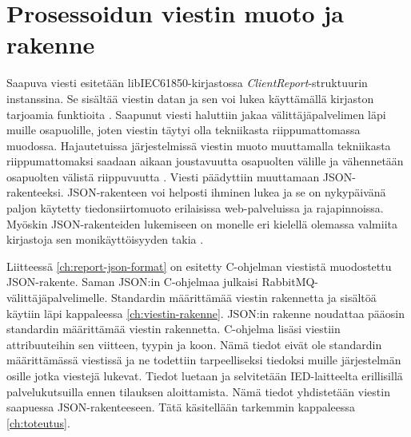 \section{Prosessoidun viestin muoto ja rakenne}
Saapuva viesti esitetään libIEC61850-kirjastossa \emph{ClientReport}-struk\-tuu\-rin instanssina. Se sisältää viestin datan ja sen voi lukea käyttämällä kirjaston tarjoamia funktioita \cite{libIEC61850-doc}. Saapunut viesti haluttiin jakaa välittäjäpalvelimen läpi muille osapuolille, joten viestin täytyi olla tekniikasta riippumattomassa muodossa. Hajautetuissa järjestelmissä viestin muoto muuttamalla tekniikasta riippumattomaksi saadaan aikaan joustavuutta osapuolten välille ja vähennetään osapuolten välistä riippuvuutta \cite[s.~838]{distributed-systems-concepts-and-design}. Viesti päädyttiin muuttamaan JSON-rakenteeksi. JSON-rakenteen voi helposti ihminen lukea ja se on nykypäivänä paljon käytetty tiedonsiirtomuoto erilaisissa web-palveluissa ja rajapinnoissa. Myöskin JSON-rakenteiden lukemiseen on monelle eri kielellä olemassa valmiita kirjastoja sen monikäyttöisyyden takia \mbox{\cite{Patrizio2016}}.

Liitteessä \ref{ch:report-json-format} on esitetty C-ohjelman viestistä muodostettu JSON-rakente. Saman JSON:in C-ohjelmaa julkaisi RabbitMQ-välittäjäpalvelimelle. Standardin määrittämää viestin rakennetta ja sisältöä käytiin läpi kappaleessa \ref{ch:viestin-rakenne}. JSON:in rakenne noudattaa pääosin standardin määrittämää viestin rakennetta. C-ohjelma lisäsi viestiin attribuuteihin sen viitteen, tyypin ja koon. Nämä tiedot eivät ole standardin määrittämässä viestissä ja ne todettiin tarpeelliseksi tiedoksi muille järjestelmän osille jotka viestejä lukevat. Tiedot luetaan ja selvitetään IED-laitteelta erillisillä palvelukutsuilla ennen tilauksen aloittamista. Nämä tiedot yhdistetään viestin saapuessa JSON-rakenteeseen. Tätä käsitellään tarkemmin kappaleessa \ref{ch:toteutus}.

